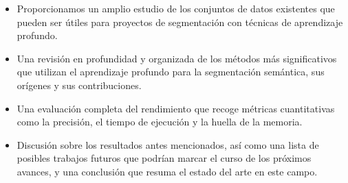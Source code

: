 \begin{itemize}
	\item Proporcionamos un amplio estudio de los conjuntos de datos existentes que pueden ser útiles para proyectos de segmentación con técnicas de aprendizaje profundo.
	\item Una revisión en profundidad y organizada de los métodos más significativos que utilizan el aprendizaje profundo para la segmentación semántica, sus orígenes y sus contribuciones.
	\item Una evaluación completa del rendimiento que recoge métricas cuantitativas como la precisión, el tiempo de ejecución y la huella de la memoria.
	\item Discusión sobre los resultados antes mencionados, así como una lista de posibles trabajos futuros que podrían marcar el curso de los próximos avances, y una conclusión que resuma el estado del arte en este campo.
\end{itemize}
